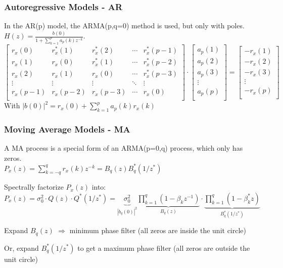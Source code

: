 \subsubsection{Autoregressive Models - AR }
\label{sec:autoregressive_model_method}
In the AR(p) model, the ARMA(p,q=0) method is used, but only with poles. $H(z)=\frac{b(0)}{1+\sum\limits_{k=1}^{p} a_p(k)z^{-k}}$.\\
 $$\begin{bmatrix} 
	 	r_x(0)  & r_x^*(1) & r_x^*(2) & \cdots & r_x^*(p-1)\\
	 	r_x(1)  & r_x(0) & r_x^*(1) & \cdots & r_x^*(p-2)\\
	 	r_x(2)  & r_x(1) & r_x(0) & \cdots & r_x^*(p-3)\\
	 	\vdots  & \vdots  & \vdots  & \ddots & \vdots\\
	 	r_x(p-1)& r_x(p-2)& r_x(p-3)& \cdots &  r_x(0)\\
   \end{bmatrix} \cdot
   \begin{bmatrix}
    	a_p(1)\\
    	a_p(2)\\
    	a_p(3)\\
    	\vdots\\
    	a_p(p)\\
   \end{bmatrix}=
   \begin{bmatrix}
       	-r_x(1)\\
       	-r_x(2)\\
       	-r_x(3)\\
       	\vdots\\
        -r_x(p)\\
   \end{bmatrix}
 $$
 With $|b(0)|^2=r_x(0) + \sum\limits_{k=1}^{p} a_p(k)r_x(k)$
 

 
 \subsubsection{Moving Average Models - MA }
A MA process is a special form of an ARMA(p=0,q) process, which only has zeros.\\
$P_x(z)=\sum\limits_{k=-q}^{q}r_x(k)z^{-k}=B_q(z)B_q^*(1/z^*)$
\begin{aufzaehlung}
	\item Spectrally factorize $P_x(z)$ into: $P_x(z)=\sigma^2_0 \cdot Q(z)\cdot Q^*(1/z^*)=\underbrace{\sigma^2_0}_{|b_q(0)|^2} \underbrace{\prod\limits_{k=1}^q (1-\beta_k z^{-1})}_{B_q(z)} \cdot \underbrace{\prod\limits_{k=1}^q (1-\beta_k^* z)}_{B^*_q(1/z^*)}$
	\item Expand $B_q(z)$ $\Rightarrow$ minimum phase filter (all zeros are inside the unit circle)
	\item Or, expand $B_q^*(1/z^*)$ to get a maximum phase filter (all zeros are outside the unit circle)
\end{aufzaehlung}

